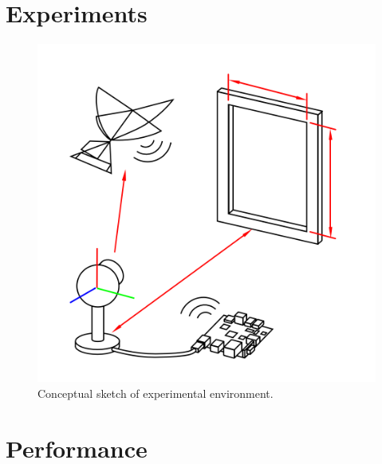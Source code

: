 \documentclass[letterpaper, 10 pt, conference]{ieeeconf}
\begin{document}

\section{Experiments}

\begin{figure}[tb]
\centering
\includegraphics[width=\linewidth]{figures/experiment_cartoon.png}
\caption{Conceptual sketch of experimental environment.}
\label{fig:experiment_sketch}
\end{figure}


\section{Performance}

\end{document}
